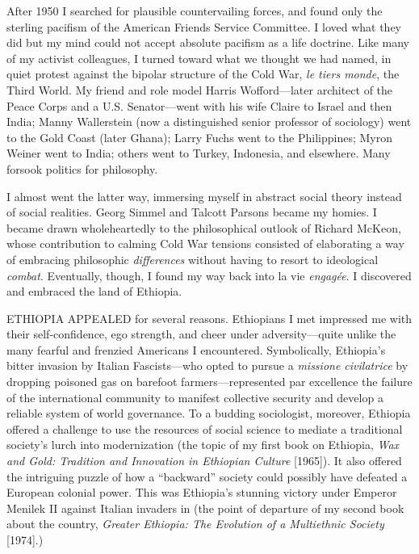 After 1950 I searched for plausible countervailing forces, and found only the sterling pacifism of the American Friends Service Committee. I loved what they did but my mind could not accept absolute pacifism as a life doctrine. Like many of my activist colleagues, I turned toward what we thought we had named, in quiet protest against the bipolar structure of the Cold War, \emph{le tiers monde}, the Third World. My friend and role model Harris Wofford---later architect of the Peace Corps and a U.S. Senator---went with his wife Claire to Israel and then India; Manny Wallerstein (now a distinguished senior professor of sociology) went to the Gold Coast (later Ghana); Larry Fuchs went to the Philippines; Myron Weiner went to India; others went to Turkey, Indonesia, and elsewhere. Many forsook politics for philosophy.

I almost went the latter way, immersing myself in abstract social theory instead of social realities. Georg Simmel and Talcott Parsons became my homies. I became drawn wholeheartedly to the philosophical outlook of Richard McKeon, whose contribution to calming Cold War tensions consisted of elaborating a way of embracing philosophic \emph{differences} without having to resort to ideological \emph{combat}. Eventually, though, I found my way back into la vie \emph{engag\'{e}e}. I discovered and embraced the land of Ethiopia.

\vspace{1.5em}

{\uppercase{Ethiopia appealed}} for several reasons. Ethiopians I met impressed me with their self-confidence, ego strength, and cheer under adversity---quite unlike the many fearful and frenzied Americans I encountered. Symbolically, Ethiopia's bitter invasion by Italian Fascists---who opted to pursue a \emph{missione civilatrice} by dropping poisoned gas on barefoot farmers---represented par excellence the failure of the international community to manifest collective security and develop a reliable system of world governance. To a budding sociologist, moreover, Ethiopia offered a challenge to use the resources of social science to mediate a traditional society's lurch into modernization (the topic of my first book on Ethiopia, \emph{Wax and Gold: Tradition and Innovation in Ethiopian Culture} [1965]). It also offered the intriguing puzzle of how a ``backward'' society could possibly have defeated a European colonial power. This was Ethiopia's stunning victory under Emperor Menilek II against Italian invaders in (the point of departure of my second book about the country, \emph{Greater Ethiopia: The Evolution of a Multiethnic Society} [1974].)

